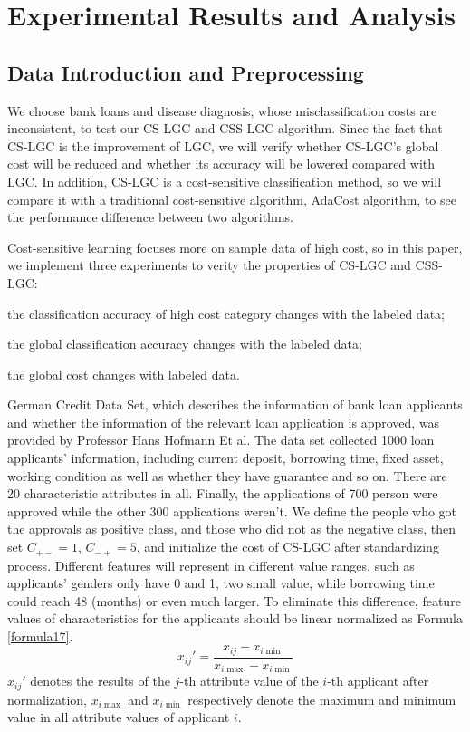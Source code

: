 \documentclass{svjour3}                     %
\begin{document}
\section{Experimental Results and Analysis}
\subsection{Data Introduction and Preprocessing}
We choose bank loans and disease diagnosis, whose misclassification costs are inconsistent, to
test our CS-LGC and CSS-LGC algorithm. Since the fact that CS-LGC is the improvement of LGC, we will verify whether CS-LGC’s global cost will be reduced and whether its accuracy will be lowered compared with LGC. In addition, CS-LGC is a cost-sensitive classification method, so we will compare it with a traditional cost-sensitive algorithm, AdaCost algorithm, to see the performance difference between two algorithms.

Cost-sensitive learning focuses more on sample data of high cost, so in this paper, we implement three experiments to verity the properties of CS-LGC and CSS-LGC:
\begin{inparaenum}[(1)]
  \item the classification accuracy of high cost category changes with the labeled data;
  \item the global classification accuracy changes with the labeled data;
  \item the global cost changes with labeled data.
\end{inparaenum}

German Credit Data Set\cite{germandata}, which describes the information of bank loan applicants and whether the information of the relevant loan application is approved, was provided by Professor Hans Hofmann Et al. The data set collected 1000 loan applicants' information, including current deposit, borrowing time, fixed asset, working condition as well as whether they have guarantee and so on. There are 20 characteristic attributes in all. Finally, the applications of 700 person were approved while the other 300 applications weren't. We define the people who got the approvals as positive class, and those who did not as the negative class, then set ${C_{ +  - }} = 1$, ${C_{ -  + }} = 5$, and initialize the cost of CS-LGC after standardizing process. Different features will represent in different value ranges, such as applicants' genders only have 0 and 1, two small value, while borrowing time could reach 48 (months) or even much larger. To eliminate this difference, feature values  of characteristics for the applicants should be linear normalized as Formula \ref{formula17}.
\begin{equation} \label{formula17}
  {x_{ij}}' = \frac{{{x_{ij}} - {x_{i\min }}}}{{{x_{i\max }} - {x_{i\min }}}}
\end{equation}
${x_{ij}}'$ denotes the results of the $j$-th attribute value of the $i$-th applicant after normalization, ${{x_{i\max }}}$ and ${{x_{i\min }}}$ respectively denote the maximum and minimum value in all attribute values of applicant $i$.
\end{document}
